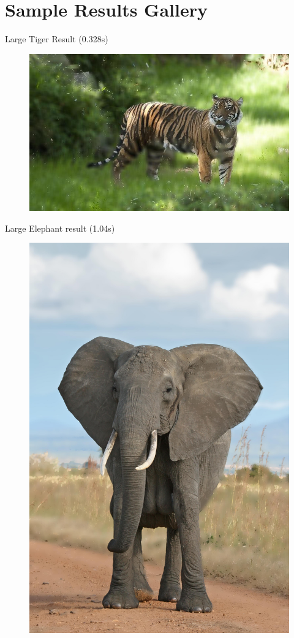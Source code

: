 \documentclass[12pt]{article}
\begin{document}
\section{Sample Results Gallery}
Large Tiger Result (0.328s)
\begin{figure}[!htb]
    \includegraphics[width=0.9\linewidth]{large_tiger_portrait.jpg}
\end{figure}
Large Elephant result (1.04s)
\begin{figure}[!htb]
    \includegraphics[width=0.9\linewidth]{large_elephant_portrait.jpg}
\end{figure}
\end{document}
